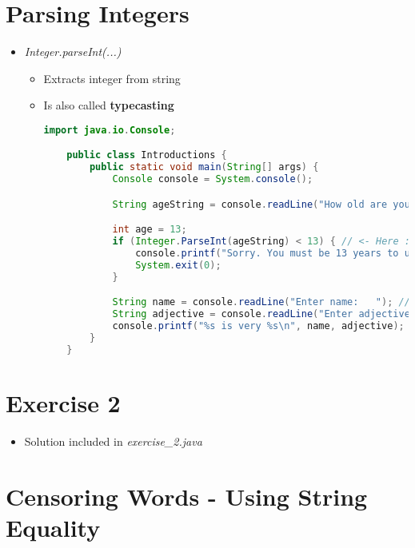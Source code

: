 \documentclass[12pt]{article}
\begin{document}
\bigskip

\section{Parsing Integers}

\bigskip

\begin{itemize}
    \item \textit{Integer.parseInt(...)}
    \begin{itemize}
        \item Extracts integer from string
        \item Is also called \textbf{typecasting}

    \begin{lstlisting}[language=Java]
    import java.io.Console;

    public class Introductions {
        public static void main(String[] args) {
            Console console = System.console();

            String ageString = console.readLine("How old are you?  ");

            int age = 13;
            if (Integer.ParseInt(ageString) < 13) { // <- Here :)
                console.printf("Sorry. You must be 13 years to use this program");
                System.exit(0);
            }

            String name = console.readLine("Enter name:   "); // <- Let's write 'Moe' here
            String adjective = console.readLine("Enter adjective:   "); // <- and 'glad to be with his love' here :)
            console.printf("%s is very %s\n", name, adjective);
        }
    }
    \end{lstlisting}
    \end{itemize}
\end{itemize}

\bigskip

\section{Exercise 2}

\bigskip

\begin{itemize}
    \item Solution included in \textit{exercise\_2.java}
\end{itemize}

\bigskip

\section{Censoring Words - Using String Equality}
\end{document}
